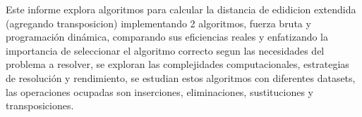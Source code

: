 Este informe explora algoritmos para calcular la distancia de edidicion extendida (agregando transposicion) implementando 2 algoritmos,
fuerza bruta y programación dinámica, comparando sus eficiencias reales y enfatizando la importancia de seleccionar el algoritmo
correcto segun las necesidades del problema a resolver, se exploran las complejidades computacionales, estrategias de resolución y 
rendimiento, se estudian estos algoritmos con diferentes datasets, las operaciones ocupadas son inserciones, eliminaciones, 
sustituciones y transposiciones.